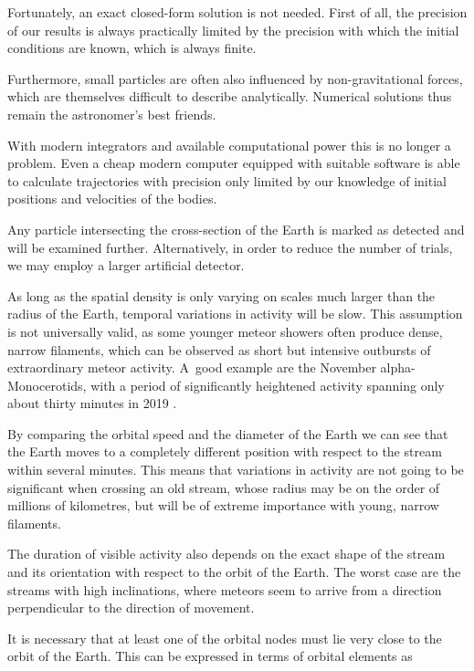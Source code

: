         Fortunately, an exact closed-form solution is not needed. First of all, the precision of our results
        is always practically limited by the precision with which the initial conditions are known,
        which is always finite.

        Furthermore, small particles are often also influenced by non-gravitational forces,
        which are themselves difficult to describe analytically.
        Numerical solutions thus remain the astronomer's best friends.

        With modern integrators and available computational power this is no longer a problem.
        Even a cheap modern computer equipped with suitable software is able to calculate trajectories
        with precision only limited by our knowledge of initial positions and velocities of the bodies.


    Any particle intersecting the cross-section of the Earth is marked as detected and will be examined further.
    Alternatively, in order to reduce the number of trials, we may employ a larger artificial detector.


    As long as the spatial density is only varying on scales much larger than the radius of the Earth,
    temporal variations in activity will be slow.
    This assumption is not universally valid, as some younger meteor showers often produce dense, narrow filaments,
    which can be observed as short but intensive outbursts of extraordinary meteor activity.
    A~good example are the November alpha-Monocerotids, with a period of significantly
    heightened activity spanning only about thirty minutes in 2019 \citep{CBET4692}.

    By comparing the orbital speed and the diameter of the Earth we can see that the Earth moves
    to a completely different position with respect to the stream within several minutes.
    This means that variations in activity are not going to be significant when crossing an old stream,
    whose radius may be on the order of millions of kilometres, but will be of extreme importance with young, narrow filaments.

    The duration of visible activity also depends on the exact shape of the stream and its orientation with respect to the orbit of the Earth.
    The worst case are the streams with high inclinations, where meteors seem to arrive from a direction perpendicular
    to the direction of movement.



    It is necessary that at least one of the orbital nodes must lie very close to the orbit of the Earth.
    This can be expressed in terms of orbital elements as


